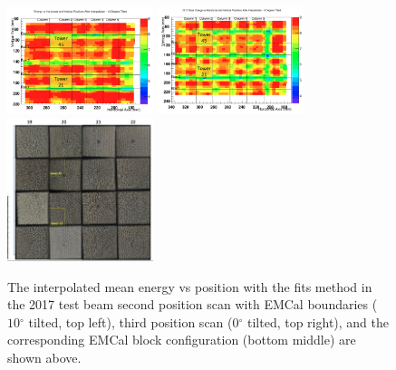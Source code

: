 \documentclass[hidelinks,11pt]{article}
\numberwithin{figure}{section}
\numberwithin{table}{section}
\newcommand{\degree}{\mbox{$^\circ$}\xspace}
\begin{document}
\begin{figure}[hbtp]
\begin{center}
\includegraphics[width=0.38\textwidth]{Plots/BlockConfig/Inter20172ndScanLabeled.png}
\includegraphics[width=0.38\textwidth]{Plots/BlockConfig/Inter20173rdScanLabeled.png}
\includegraphics[width=0.38\textwidth]{Plots/BlockConfig/BlockConfig.png}
\caption{The interpolated mean energy vs position with the fits method in the 2017 test beam second position scan with EMCal boundaries ($10 \degree$ tilted, top left), third position scan ($0 \degree$ tilted, top right), and the corresponding EMCal block configuration (bottom middle) are shown above.}
\label{fig:BlockEMCAL}
\end{center}
\end{figure} 
\end{document}
